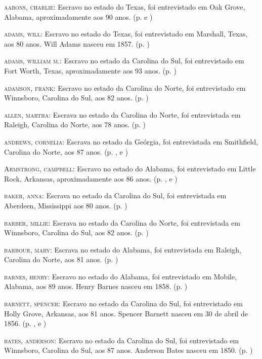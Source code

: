 \begin{Parskip}
\textsc{aarons, charlie:} Escravo no estado do Texas, foi entrevistado
em Oak Grove, Alabama, aproximadamente aos 90 anos. (p. \pageref{ref01} e \pageref{ref02})

\textsc{adams, will:} Escravo no estado do Texas, foi entrevistado em
Marshall, Texas, aos 80 anos. Will Adams nasceu em 1857. (p. \pageref{ref03})

\textsc{adams, william m.:} Escravo no estado da Carolina do Sul, foi
entrevistado em Fort Worth, Texas, aproximadamente aos 93 anos. (p. \pageref{ref04})

\textsc{adamson, frank:} Escravo no estado da Carolina do Norte, foi
entrevistado em Winnsboro, Carolina do Sul, aos 82 anos. (p. \pageref{ref05})

\textsc{allen, martha:} Escrava no estado da Carolina do Norte, foi
entrevistada em Raleigh, Carolina do Norte, aos 78 anos. (p. \pageref{ref06})

\textsc{andrews, cornelia:} Escrava no estado da Geórgia, foi
entrevistada em Smithfield, Carolina do Norte, aos 87 anos. (p. \pageref{ref07}, \pageref{ref08} e \pageref{ref09})

\textsc{Armstrong, campbell:} Escravo no estado do Alabama, foi
entrevistado em Little Rock, Arkansas, aproximadamente aos 86 anos. (p. \pageref{ref10}, \pageref{ref11} e \pageref{ref12})

\textsc{baker, anna:} Escrava no estado da Carolina do Sul, foi
entrevistada em Aberdeen, Mississippi aos 80 anos. (p. \pageref{ref13})

\textsc{barber, millie:} Escrava no estado da Carolina do Norte, foi
entrevistada em Winnsboro, Carolina do Sul, aos 82 anos. (p. \pageref{ref14})

\textsc{barbour, mary:} Escrava no estado do Alabama, foi entrevistada
em Raleigh, Carolina do Norte, aos 81 anos. (p. \pageref{ref15})

\textsc{barnes, henry:} Escravo no estado do Alabama, foi entrevistado
em Mobile, Alabama, aos 89 anos. Henry Barnes nasceu em 1858. (p. \pageref{ref16})

\textsc{barnett, spencer:} Escravo no estado da Carolina do Sul, foi
entrevistado em Holly Grove, Arkansas, aos 81 anos. Spencer Barnett
nasceu em 30 de abril de 1856. (p. \pageref{ref17}, \pageref{ref18} e \pageref{ref19})

\textsc{bates, anderson:} Escravo no estado da Carolina do Sul, foi
entrevistado em Winnsboro, Carolina do Sul, aos 87 anos. Anderson Bates
nasceu em 1850. (p. \pageref{ref20})


\end{Parskip}
